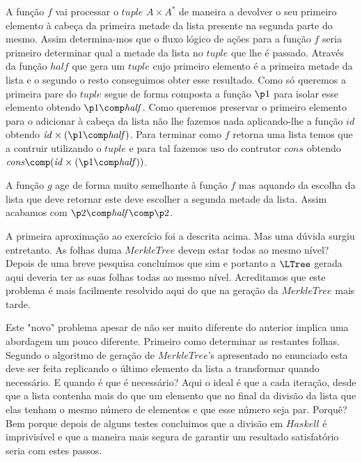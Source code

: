 \documentclass[a4paper]{article}
\newcommand{\Varid}[1]{\mathit{#1}}
\begin{document}
A função $f$ vai processar o $tuple$ $A \ensuremath{\times} A^*$ de maneira a devolver o seu primeiro elemento à cabeça da primeira 
metade da lista presente na segunda parte do mesmo. Assim determina-mos que o fluxo lógico de ações para a função $f$ 
seria primeiro determinar qual a metade da lista no $tuple$ que lhe é passado. Através da função $half$ que gera um 
$tuple$ cujo primeiro elemento é a primeira metade da lista e o segundo o resto conseguimos obter esse resultado. 
Como só queremos a primeira pare do $tuple$ segue de forma composta a função $\ensuremath{\p1}$ para isolar esse elemento obtendo 
$\ensuremath{\p1\comp \Varid{half}}$. Como queremos preservar o primeiro elemento para o adicionar à cabeça da lista não lhe
fazemos nada aplicando-lhe a função $\ensuremath{\Varid{id}}$ obtendo $\ensuremath{\Varid{id}\times(\p1\comp \Varid{half})}$. Para terminar como $f$ retorna uma lista
temos que a contruir utilizando o $tuple$ e para tal fazemos uso do contrutor $\ensuremath{\Varid{cons}}$ obtendo 
$\ensuremath{\Varid{cons}\comp (\Varid{id}\times(\p1\comp \Varid{half}))}$.

A função $g$ age de forma muito semelhante à função $f$ mas aquando da escolha da lista que deve retornar este deve
escolher a segunda metade da lista. Assim acabamos com $\ensuremath{\p2\comp \Varid{half}\comp \p2}$.

A primeira aproximação ao exercício foi a descrita acima. Mas uma dúvida surgiu entretanto. As folhas duma $MerkleTree$ 
devem estar todas ao mesmo nível? Depois de uma breve pesquisa concluímos que sim e portanto a $\ensuremath{{\LTree}}$ gerada aqui
deveria ter as suas folhas todas ao mesmo nível. Acreditamos que este problema é mais facilmente resolvido aqui do que
na geração da $MerkleTree$ mais tarde.

Este "novo" problema apesar de não ser muito diferente do anterior implica uma abordagem um pouco diferente. Primeiro
como determinar as restantes folhas. Segundo o algoritmo de geração de $MerkleTree$'s apresentado no enunciado esta deve
ser feita replicando o último elemento da lista a transformar quando necessário. E quando é que é necessário? Aqui o
ideal é que a cada iteração, desde que a lista contenha mais do que um elemento que no final da divisão da lista que
elas tenham o mesmo número de elementos e que esse número seja par. Porquê? Bem porque depois de alguns testes concluimos
que a divisão em $Haskell$ é imprivisível e que a maneira mais segura de garantir um resultado satisfatório seria com estes
passos.
\end{document}
